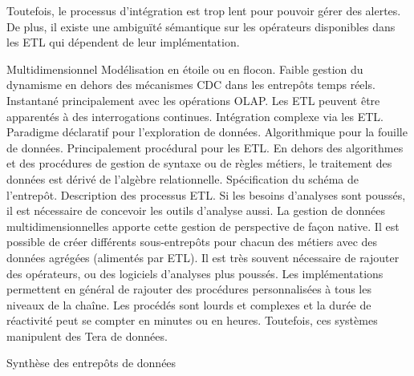 Toutefois, le processus d'intégration est trop lent pour pouvoir gérer des alertes. De plus, il existe une ambiguïté sémantique sur les opérateurs disponibles dans les ETL qui dépendent de leur implémentation.

\begin{table}[!ht]
\criteretabDonnee
    {Multidimensionnel}
    {Modélisation en étoile ou en flocon.}
    {Faible gestion du dynamisme en dehors des mécanismes CDC dans les entrepôts temps réels.}
\criteretabTraitement
    {Instantané principalement avec les opérations OLAP. Les ETL peuvent être apparentés à des interrogations continues.}
    {Intégration complexe via les ETL.}
    {Paradigme déclaratif pour l'exploration de données. Algorithmique pour la fouille de données. Principalement procédural pour les ETL.}
    {En dehors des algorithmes et des procédures de gestion de syntaxe ou de règles métiers, le traitement des données est dérivé de l'algèbre relationnelle.}
\criteretabAdaptabilite
    {Spécification du schéma de l'entrepôt. Description des processus ETL. Si les besoins d'analyses sont poussés, il est nécessaire de concevoir les outils d'analyse aussi.}
    {La gestion de données multidimensionnelles apporte cette gestion de perspective de façon native. Il est possible de créer différents sous-entrepôts pour chacun des métiers avec des données agrégées (alimentés par ETL).}
    {Il est très souvent nécessaire de rajouter des opérateurs, ou des logiciels d'analyses plus poussés. Les implémentations permettent en général de rajouter des procédures personnalisées à tous les niveaux de la chaîne.}
    {Les procédés sont lourds et complexes et la durée de réactivité peut se compter en minutes ou en heures. Toutefois, ces systèmes manipulent des Tera de données.}
\caption{Synthèse des entrepôts de données}\label{tab:rw:supervision:warehouses:synthese}
\end{table}
